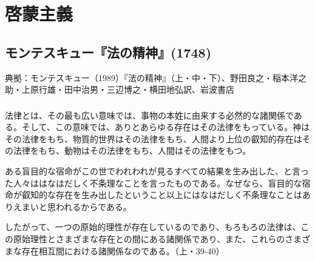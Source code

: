 

\chapter{啓蒙主義}



\section{モンテスキュー『法の精神』(1748)}



典拠：モンテスキュー（1989）『法の精神』（上・中・下）、野田良之・稲本洋之助・上原行雄・田中治男・三辺博之・横田地弘訳、岩波書店







\subsection{}


法律とは、その最も広い意味では、事物の本姓に由来する必然的な諸関係である。そして、この意味では、ありとあらゆる存在はその法律をもっている。神はその法律をもち、物質的世界はその法律をもち、人間より上位の叡知的存在はその法律をもち、動物はその法律をもち、人間はその法律をもつ。

ある盲目的な宿命がこの世でわれわれが見るすべての結果を生み出した、と言った人々ははなはだしく不条理なことを言ったものである。なぜなら、盲目的な宿命が叡知的な存在を生み出したということ以上にはなはだしく不条理なことはありえまいと思われるからである。

したがって、一つの原始的理性が存在しているのであり、もろもろの法律は、この原始理性とさまざまな存在との間にある諸関係であり、また、これらのさまざまな存在相互間における諸関係なのである。（上・39-40）

\subsection{}



